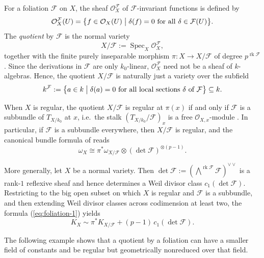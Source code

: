 \documentclass[reqno,oneside]{amsart}
\theoremstyle{definition}
\theoremstyle{plain}
\numberwithin{equation}{section}
\begin{document}
For a foliation $\mathcal F$ on $X$, the sheaf $\mathcal O_X^{\mathcal F}$ of $\mathcal F$-invariant functions is defined by
\[
  \mathcal O_X^{\mathcal F}(U)=\bigl\{f\in\mathcal O_X(U)\bigm|\delta(f)=0\text{ for all }\delta\in\mathcal F(U)\bigr\}.
\]
The \emph{quotient} by $\mathcal F$ is the normal variety
\[
  X/\mathcal F:=\operatorname{Spec}_X\mathcal O_X^{\mathcal F},
\]
together with the finite purely inseparable morphism $\pi\colon X\to X/\mathcal F$ of degree $p^{\operatorname{rk}\mathcal F}$.
Since the derivations in $\mathcal F$ are only $k_0$-linear, $\mathcal O_X^{\mathcal F}$ need not be a sheaf of $k$-algebras.
Hence, the quotient $X/\mathcal F$ is naturally just a variety over the subfield
\[
  k^{\mathcal F}:=\bigl\{a\in k\bigm|\delta(a)=0\text{ for all local sections }\delta\text{ of }\mathcal F\bigr\}\subseteq k.
\]

\smallskip
When $X$ is regular, the quotient $X/\mathcal F$ is regular at $\pi(x)$ if and only if $\mathcal F$ is a subbundle of $T_{X/k_0}$ at $x$, i.e.\ the stalk $(T_{X/k_0}/\mathcal F)_x$ is a free $\mathcal O_{X,x}$-module \cite[Proposition~2.4]{Ekedahl87F}.
In particular, if $\mathcal F$ is a subbundle everywhere, then $X/\mathcal F$ is regular, and the canonical bundle formula of \cite[Corollary~3.4]{Ekedahl87F} reads
\begin{equation}\label{eq:foliation-1}
  \omega_X\cong\pi^*\omega_{X/\mathcal F}\otimes(\det\mathcal F)^{\otimes(p-1)}.
\end{equation}

More generally, let $X$ be a normal variety. 
Then $\det\mathcal F:=(\bigwedge^{\operatorname{rk}\mathcal F}\mathcal F)^{\vee\vee}$ is a rank-$1$ reflexive sheaf and hence determines a Weil divisor class $c_1(\det\mathcal F)$. Restricting to the big open subset on which $X$ is regular and $\mathcal F$ is a subbundle, and then extending Weil divisor classes across codimension at least two, the formula (\ref{eq:foliation-1}) yields
\begin{equation}\label{eq:foliation-2}
  K_X\sim\pi^*K_{X/\mathcal F}+(p-1)\,c_1(\det\mathcal F).
\end{equation}

The following example shows that a quotient by a foliation can have a smaller field of constants and be regular but geometrically nonreduced over that field.
\end{document}

